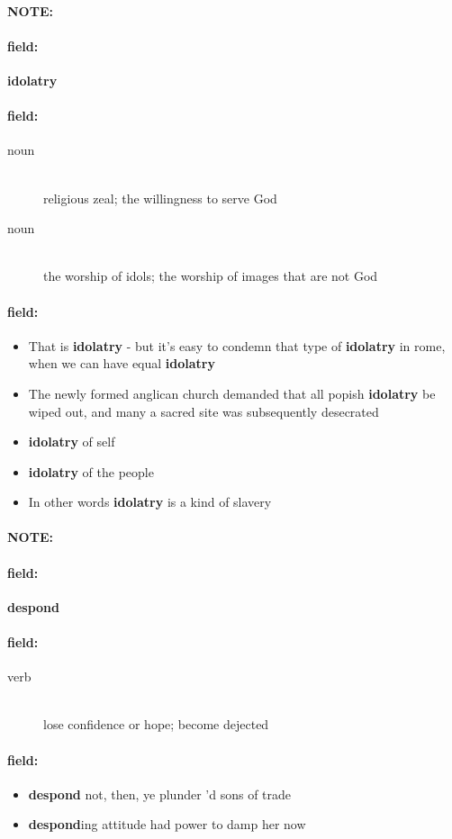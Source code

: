 \documentclass[12pt]{article}
\newenvironment{note}{\paragraph{NOTE:}}{}
\newenvironment{field}{\paragraph{field:}}{}
\begin{document}
\begin{note}
\begin{field}
\textbf{\large idolatry}
\end{field}


\begin{field}
\begin{description}
\item[noun] \hfill \\ 
religious zeal; the willingness to serve God

\item[noun] \hfill \\ 
the worship of idols; the worship of images that are not God

\end{description}
\end{field}

\begin{field}
\begin{itemize}
\item That is \textbf{idolatry} - but it's easy to condemn that type of \textbf{idolatry} in rome, when we can have equal \textbf{idolatry}
\item The newly formed anglican church demanded that all popish \textbf{idolatry} be wiped out, and many a sacred site was subsequently desecrated
\item \textbf{idolatry} of self
\item \textbf{idolatry} of the people
\item In other words \textbf{idolatry} is a kind of slavery
\end{itemize}
\end{field}
\end{note}
\begin{note}
\begin{field}
\textbf{\large despond}
\end{field}


\begin{field}
\begin{description}
\item[verb] \hfill \\ 
lose confidence or hope; become dejected

\end{description}
\end{field}

\begin{field}
\begin{itemize}
\item \textbf{despond} not, then, ye plunder 'd sons of trade
\item \textbf{despond}ing attitude had power to damp her now
\end{itemize}
\end{field}
\end{note}
\end{document}
